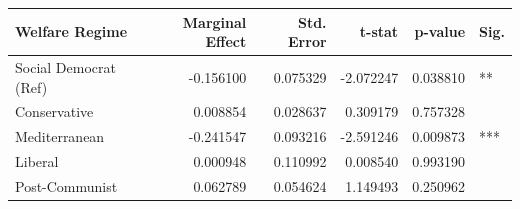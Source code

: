 \begin{tabular}{lrrrrl}
\toprule
Welfare Regime & Marginal Effect & Std. Error & t-stat & p-value & Sig. \\
\midrule
Social Democrat (Ref) & -0.156100 & 0.075329 & -2.072247 & 0.038810 & ** \\
Conservative & 0.008854 & 0.028637 & 0.309179 & 0.757328 &  \\
Mediterranean & -0.241547 & 0.093216 & -2.591246 & 0.009873 & *** \\
Liberal & 0.000948 & 0.110992 & 0.008540 & 0.993190 &  \\
Post-Communist & 0.062789 & 0.054624 & 1.149493 & 0.250962 &  \\
\bottomrule
\end{tabular}
